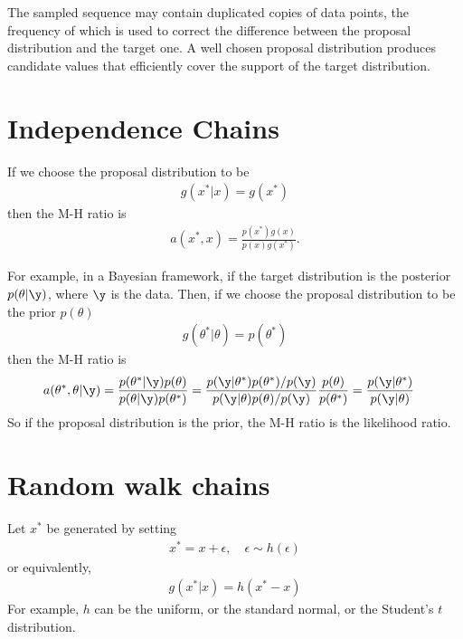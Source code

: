 \documentclass{book}
\begin{document}
The sampled sequence may contain duplicated copies of data points, the frequency of which is used to correct the difference between the proposal distribution and the target one. A well chosen proposal distribution produces candidate values that efficiently cover the support of the target distribution.

\section{Independence Chains}
If we choose the proposal distribution to be
\begin{align}
g(x^*|x) = g(x^*)
\end{align}
then the M-H ratio is
\begin{align}
a(x^*, x) = \frac{p(x^*)g(x)}{p(x)g(x^*)}.
\end{align}

For example, in a Bayesian framework, if the target distribution is the posterior $p(\theta|\y)$, where $\y$ is the data. Then, if we choose the proposal distribution to be the prior $p(\theta)$
\begin{align}
g(\theta^*|\theta) = p(\theta^*)
\end{align}
then the M-H ratio is
\begin{align}
a(\theta^*, \theta | \y) &= \frac{p(\theta^*|\y)p(\theta)}{p(\theta|\y)p(\theta^*)} = \frac{p(\y|\theta^*)p(\theta^*)/p(\y)}{p(\y|\theta)p(\theta)/p(\y)}\frac{p(\theta)}{p(\theta^*)} = \frac{p(\y|\theta^*)}{p(\y|\theta)}
\end{align}
So if the proposal distribution is the prior, the M-H ratio is the likelihood ratio.

\section{Random walk chains}
Let $x^*$ be generated by setting
\begin{align}
x^* = x + \epsilon,\quad \epsilon \sim h(\epsilon)
\end{align}
or equivalently,
\begin{align}
g(x^*|x) = h(x^* - x)
\end{align}
For example, $h$ can be the uniform, or the standard normal, or the Student's $t$ distribution.
\end{document}
